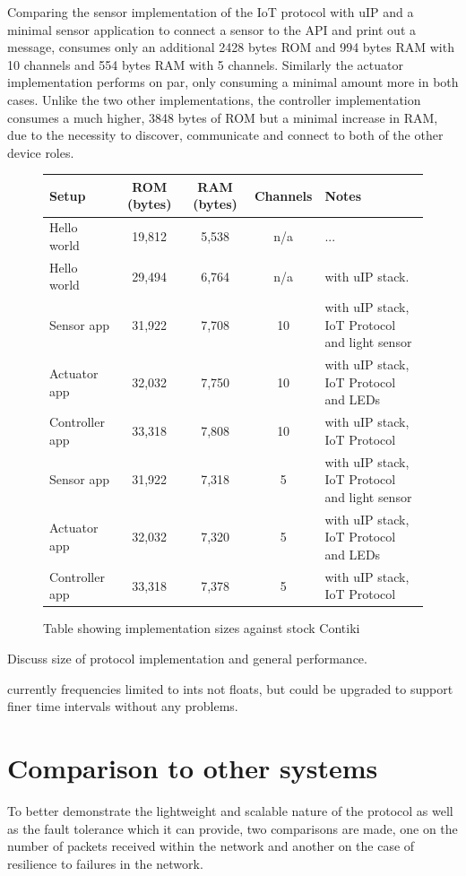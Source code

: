 Comparing the sensor implementation of the IoT protocol with uIP and a minimal sensor application to connect a sensor to the API and print out a message, consumes only an additional 2428 bytes ROM and 994 bytes RAM with 10 channels and 554 bytes RAM with 5 channels.
Similarly the actuator implementation performs on par, only consuming a minimal amount more in both cases. Unlike the two other implementations, the controller implementation consumes a much higher, 3848 bytes of ROM but a minimal increase in RAM, due to the necessity to discover, communicate and connect to both of the other device roles.
\begin{figure}[h]
\begin{center}
    \begin{tabular}{| l | c | c | c | l |}
    \hline
    Setup & ROM (bytes) & RAM (bytes) & Channels & Notes \\ \hline
    Hello world & 19,812 & 5,538 & n/a &... \\ \hline
    Hello world & 29,494 & 6,764 & n/a & with uIP stack. \\ \hline
    Sensor app & 31,922 & 7,708 & 10 & with uIP stack, IoT Protocol and light sensor\\ \hline
    Actuator app & 32,032 & 7,750 & 10 & with uIP stack, IoT Protocol and LEDs \\ \hline
    Controller app & 33,318 & 7,808 & 10 & with uIP stack, IoT Protocol \\ \hline
    Sensor app & 31,922 & 7,318 & 5 & with uIP stack, IoT Protocol and light sensor\\ \hline
    Actuator app & 32,032 & 7,320 & 5 & with uIP stack, IoT Protocol and LEDs \\ \hline
    Controller app & 33,318 & 7,378 & 5 & with uIP stack, IoT Protocol \\ 
    \hline
    \end{tabular}
\end{center}
\caption{Table showing implementation sizes against stock Contiki}
\label{tab:size}
\end{figure}



Discuss size of protocol implementation and general performance.

currently frequencies limited to ints not floats, but could be upgraded to support finer time intervals without any problems.

\section{Comparison to other systems} %
\label{sec:comparison_to_other_systems}
To better demonstrate the lightweight and scalable nature of the protocol as well as the fault tolerance which it can provide, two comparisons are made, one on the number of packets received within the network and another on the case of resilience to failures in the network.

